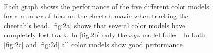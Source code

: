\documentclass[11pt]{article}
\begin{document}
\begin{figure}
\centering
{}
\\
\caption{Each graph shows the performance of the five different color models for
a number of bins on the cheetah movie when tracking the cheetah's head.
\ref{fig:2a} shows that several color models have completely lost track. In
\ref{fig:2b} only the $xyz$ model failed. In both \ref{fig:2c} and \ref{fig:2d}
all color models show good performance.}
\label{fig:cheetah}
\end{figure}
\end{document}
